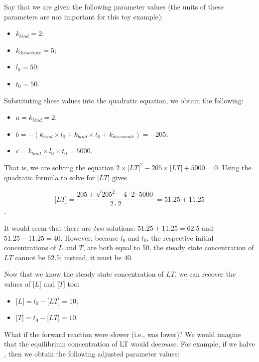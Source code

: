 Say that we are given the following parameter values (the units of these parameters are not important for this toy example):
\begin{itemize}
 \item $ k_{bind}= 2$;
 \item $k_{dissociate} = 5$;
 \item $l_0 = 50$;
 \item $t_0 = 50$.
\end{itemize}

Substituting these values into the quadratic equation, we obtain the following:

\begin{itemize}
 \item $a = k_{bind} = 2$;
 \item $b = - (k_{bind} \times l_0 + k_{bind} \times t_0 + k_{dissociate}) = -205$;
 \item $c = k_{bind} \times l_0 \times t_0 = 5000$.
\end{itemize}

That is, we are solving the equation $2 \times \text{[}LT\text{]}^2 - 205 \times \text{[}LT\text{]} + 5000 = 0$. Using the quadratic formula to solve for $\text{[}LT\text{]}$ gives

$$\text{[}LT\text{]} = \frac{205 \pm \sqrt{205^2 - 4 \cdot 2 \cdot 5000}}{2 \cdot 2} = 51.25 \pm 11.25$$.

It would seem that there are \textit{two} solutions: $51.25 + 11.25 = 62.5$ and $51.25 - 11.25 = 40$. However, because $l_0$ and $t_0$, the respective initial concentrations of $L$ and $T$, are both equal to 50, the steady state concentration of $LT$ cannot be $62.5$; instead, it must be $40$.

Now that we know the steady state concentration of $LT$, we can recover the values of $\text{[}L\text{]}$ and $\text{[}T\text{]}$ too:

\begin{itemize}
 \item $\text{[}L\text{]} = l_0 - \text{[}LT\text{]} = 10$;
 \item $\text{[}T\text{]} = t_0 - \text{[}LT\text{]} = 10$.
\end{itemize}

What if the forward reaction were slower (i.e.,  was lower)? We would imagine that the equilibrium concentration of \text{[}LT\text{]} would decrease. For example, if we halve , then we obtain the following adjusted parameter values:

